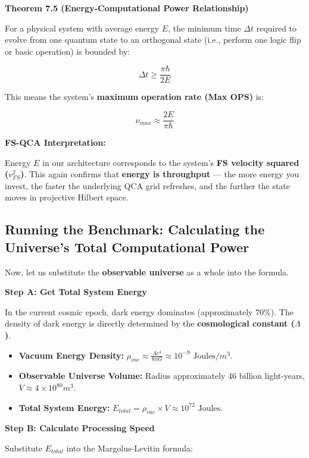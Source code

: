 \documentclass[11pt,a4paper,twoside]{book}
\begin{document}
\textbf{Theorem 7.5 (Energy-Computational Power Relationship)}

For a physical system with average energy \textbf{$E$}, the minimum time \textbf{$\Delta t$} required to evolve from one quantum state to an orthogonal state (i.e., perform one logic flip or basic operation) is bounded by:

$$\Delta t \ge \frac{\pi \hbar}{2E}$$

This means the system's \textbf{maximum operation rate (Max OPS)} is:

$$\nu_{max} \approx \frac{2E}{\pi \hbar}$$

\textbf{FS-QCA Interpretation:}

Energy \textbf{$E$} in our architecture corresponds to the system's \textbf{FS velocity squared ($v_{FS}^2$)}. This again confirms that \textbf{energy is throughput} --- the more energy you invest, the faster the underlying QCA grid refreshes, and the further the state moves in projective Hilbert space.

\subsection{Running the Benchmark: Calculating the Universe's Total Computational Power}

Now, let us substitute the \textbf{observable universe} as a whole into the formula.

\textbf{Step A: Get Total System Energy}

In the current cosmic epoch, dark energy dominates (approximately 70\%). The density of dark energy is directly determined by the \textbf{cosmological constant ($\Lambda$)}.

\begin{itemize}
\item \textbf{Vacuum Energy Density:} $\rho_{vac} \approx \frac{\Lambda c^4}{8 \pi G} \approx 10^{-9} \text{ Joules}/m^3$.

\item \textbf{Observable Universe Volume:} Radius approximately 46 billion light-years, $V \approx 4 \times 10^{80} m^3$.

\item \textbf{Total System Energy:} $E_{total} = \rho_{vac} \times V \approx 10^{72} \text{ Joules}$.
\end{itemize}

\textbf{Step B: Calculate Processing Speed}

Substitute $E_{total}$ into the Margolus-Levitin formula:
\end{document}
